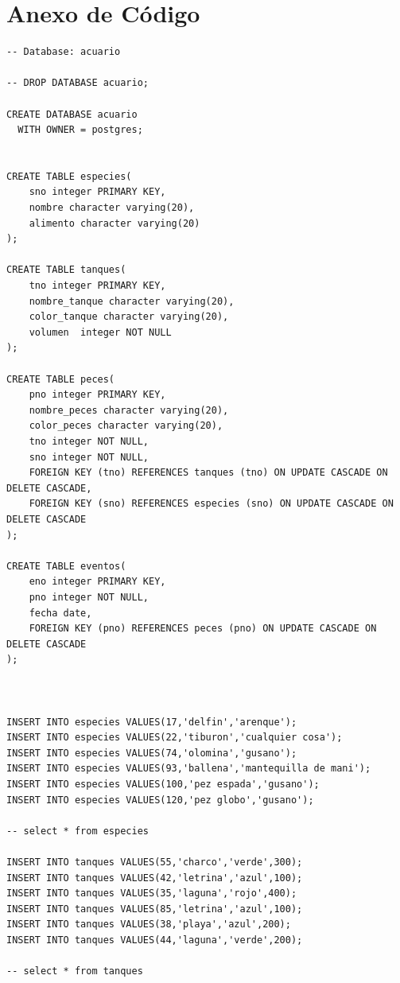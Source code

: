 \documentclass[letter,12pt]{report}
\begin{document}
\chapter{Anexo de Código}\label{codigoA}
\lstset{language=SQL}
   \vspace{-0.8cm}
\begin{lstlisting}
-- Database: acuario

-- DROP DATABASE acuario;

CREATE DATABASE acuario
  WITH OWNER = postgres;


CREATE TABLE especies(
    sno integer PRIMARY KEY,
    nombre character varying(20),
    alimento character varying(20)
);

CREATE TABLE tanques(
    tno integer PRIMARY KEY,
    nombre_tanque character varying(20),
    color_tanque character varying(20),
    volumen  integer NOT NULL
);

CREATE TABLE peces(
    pno integer PRIMARY KEY,
    nombre_peces character varying(20),
    color_peces character varying(20),
    tno integer NOT NULL,
    sno integer NOT NULL,
    FOREIGN KEY (tno) REFERENCES tanques (tno) ON UPDATE CASCADE ON DELETE CASCADE,
    FOREIGN KEY (sno) REFERENCES especies (sno) ON UPDATE CASCADE ON DELETE CASCADE
);

CREATE TABLE eventos(
    eno integer PRIMARY KEY,
    pno integer NOT NULL,
    fecha date,
    FOREIGN KEY (pno) REFERENCES peces (pno) ON UPDATE CASCADE ON DELETE CASCADE
);



INSERT INTO especies VALUES(17,'delfin','arenque');
INSERT INTO especies VALUES(22,'tiburon','cualquier cosa');
INSERT INTO especies VALUES(74,'olomina','gusano');
INSERT INTO especies VALUES(93,'ballena','mantequilla de mani');
INSERT INTO especies VALUES(100,'pez espada','gusano');
INSERT INTO especies VALUES(120,'pez globo','gusano');

-- select * from especies

INSERT INTO tanques VALUES(55,'charco','verde',300);
INSERT INTO tanques VALUES(42,'letrina','azul',100);
INSERT INTO tanques VALUES(35,'laguna','rojo',400);
INSERT INTO tanques VALUES(85,'letrina','azul',100);
INSERT INTO tanques VALUES(38,'playa','azul',200);
INSERT INTO tanques VALUES(44,'laguna','verde',200);

-- select * from tanques



\end{lstlisting}
\end{document}
